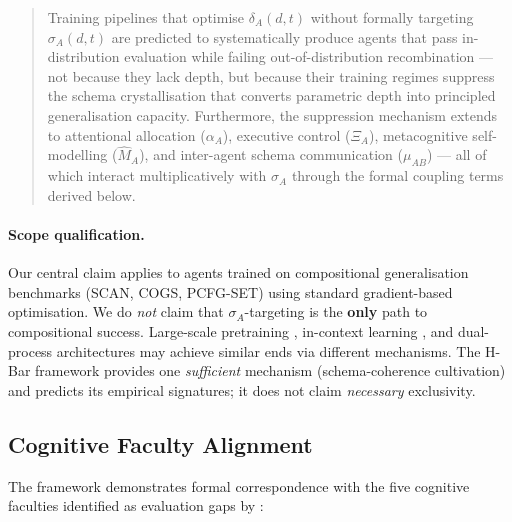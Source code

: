 \documentclass[11pt,a4paper]{article}
\begin{document}
\begin{quote}
Training pipelines that optimise $\delta_A(d,t)$ without formally
targeting $\sigma_A(d,t)$ are predicted to systematically produce
agents that pass in-distribution evaluation while failing
out-of-distribution recombination --- not because they lack depth,
but because their training regimes suppress the schema crystallisation
that converts parametric depth into principled generalisation capacity.
Furthermore, the suppression mechanism extends to attentional allocation
($\alpha_A$), executive control ($\Xi_A$), metacognitive self-modelling
($\hat M_A$), and inter-agent schema communication ($\mu_{AB}$) ---
all of which interact multiplicatively with $\sigma_A$ through the
formal coupling terms derived below.
\end{quote}

\paragraph{Scope qualification.}
Our central claim applies to agents trained on compositional
generalisation benchmarks (SCAN, COGS, PCFG-SET) using standard
gradient-based optimisation. We do \emph{not} claim that
$\sigma_A$-targeting is the \textbf{only} path to compositional
success. Large-scale pretraining \citep{kaplan2020scaling},
in-context learning \citep{min2022rethinking}, and dual-process
architectures \citep{noviello2025neuroscienceinspiredualprocess} may achieve similar ends via
different mechanisms. The H-Bar framework provides one
\emph{sufficient} mechanism (schema-coherence cultivation) and
predicts its empirical signatures; it does not claim \emph{necessary}
exclusivity.

\subsection{Cognitive Faculty Alignment}\label{sec:cognitive-faculty-alignment}

The framework demonstrates formal correspondence with the five cognitive
faculties identified as evaluation gaps by \cite{burnell2026measuringprogressagi}:
\end{document}
